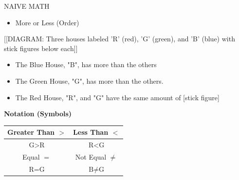 \documentclass{article}
\begin{document}
\begin{center}
    NAIVE MATH
\end{center}

\begin{itemize}
    \item More or Less (Order)
\end{itemize}

[[DIAGRAM: Three houses labeled 'R' (red), 'G' (green), and 'B' (blue) with stick figures below each]]

\begin{itemize}
    \item The Blue House, "B", has more than the others
    \item The Green House, "G", has more than the others.
    \item The Red House, "R", and "G" have the same amount of [stick figure]
\end{itemize}

\noindent\textbf{Notation (Symbols)}

\begin{tabular}{|c|c|}
    \hline
    Greater Than $>$ & Less Than $<$ \\
    \hline
    $\text{G} > \text{R}$ & $\text{R} < \text{G}$ \\
    \hline
    Equal $=$ & Not Equal $\neq$ \\
    \hline
    $\text{R} = \text{G}$ & $\text{B} \neq \text{G}$ \\
    \hline
\end{tabular}
\end{document}
